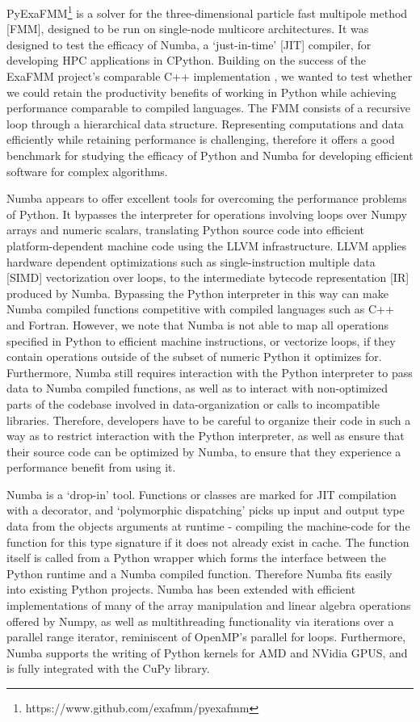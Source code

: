 \documentclass{IEEEcsmag}
\begin{document}
PyExaFMM\footnote{https://www.github.com/exafmm/pyexafmm} is a solver for the three-dimensional particle fast multipole method [FMM], designed to be run on single-node multicore architectures. It was designed to test the efficacy of Numba, a `just-in-time' [JIT] compiler, for developing HPC applications in CPython. Building on the success of the ExaFMM project's comparable C++ implementation \cite{Wang2021}, we wanted to test whether we could retain the productivity benefits of working in Python while achieving performance comparable to compiled languages.  The FMM consists of a recursive loop through a hierarchical data structure. Representing computations and data efficiently while retaining performance is challenging, therefore it offers a good benchmark for studying the efficacy of Python and Numba for developing efficient software for complex algorithms.

Numba appears to offer excellent tools for overcoming the performance problems of Python. It bypasses the interpreter for operations involving loops over Numpy arrays and numeric scalars, translating Python source code into efficient platform-dependent machine code using the LLVM infrastructure. LLVM applies hardware dependent optimizations such as single-instruction multiple data [SIMD] vectorization over loops, to the intermediate bytecode representation [IR] produced by Numba. Bypassing the Python interpreter in this way can make Numba compiled functions competitive with compiled languages such as C++ and Fortran. However, we note that Numba is not able to map all operations specified in Python to efficient machine instructions, or vectorize loops, if they contain operations outside of the subset of numeric Python it optimizes for. Furthermore, Numba still requires interaction with the Python interpreter to pass data to Numba compiled functions, as well as to interact with non-optimized parts of the codebase involved in data-organization or calls to incompatible libraries. Therefore, developers have to be careful to organize their code in such a way as to restrict interaction with the Python interpreter, as well as ensure that their source code can be optimized by Numba, to ensure that they experience a performance benefit from using it.

Numba is a `drop-in' tool. Functions or classes are marked for JIT compilation with a decorator, and `polymorphic dispatching' picks up input and output type data from the objects arguments at runtime - compiling the machine-code for the function for this type signature if it does not already exist in cache. The function itself is called from a Python wrapper which forms the interface between the Python runtime and a Numba compiled function. Therefore Numba fits easily into existing Python projects. Numba has been extended with efficient implementations of many of the array manipulation and linear algebra operations offered by Numpy, as well as multithreading functionality via iterations over a parallel range iterator, reminiscent of OpenMP's parallel for loops. Furthermore, Numba supports the writing of Python kernels for AMD and NVidia GPUS, and is fully integrated with the CuPy library.
\end{document}
